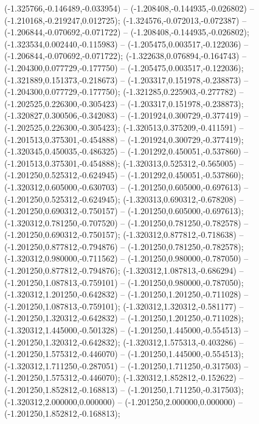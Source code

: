  (-1.325766,-0.146489,-0.033954) -- (-1.208408,-0.144935,-0.026802) -- (-1.210168,-0.219247,0.012725);
 (-1.324576,-0.072013,-0.072387) -- (-1.206844,-0.070692,-0.071722) -- (-1.208408,-0.144935,-0.026802);
 (-1.323534,0.002440,-0.115983) -- (-1.205475,0.003517,-0.122036) -- (-1.206844,-0.070692,-0.071722);
 (-1.322638,0.076894,-0.164743) -- (-1.204300,0.077729,-0.177750) -- (-1.205475,0.003517,-0.122036);
 (-1.321889,0.151373,-0.218673) -- (-1.203317,0.151978,-0.238873) -- (-1.204300,0.077729,-0.177750);
 (-1.321285,0.225903,-0.277782) -- (-1.202525,0.226300,-0.305423) -- (-1.203317,0.151978,-0.238873);
 (-1.320827,0.300506,-0.342083) -- (-1.201924,0.300729,-0.377419) -- (-1.202525,0.226300,-0.305423);
 (-1.320513,0.375209,-0.411591) -- (-1.201513,0.375301,-0.454888) -- (-1.201924,0.300729,-0.377419);
 (-1.320345,0.450035,-0.486325) -- (-1.201292,0.450051,-0.537860) -- (-1.201513,0.375301,-0.454888);
 (-1.320313,0.525312,-0.565005) -- (-1.201250,0.525312,-0.624945) -- (-1.201292,0.450051,-0.537860);
 (-1.320312,0.605000,-0.630703) -- (-1.201250,0.605000,-0.697613) -- (-1.201250,0.525312,-0.624945);
 (-1.320313,0.690312,-0.678208) -- (-1.201250,0.690312,-0.750157) -- (-1.201250,0.605000,-0.697613);
 (-1.320312,0.781250,-0.707520) -- (-1.201250,0.781250,-0.782578) -- (-1.201250,0.690312,-0.750157);
 (-1.320312,0.877812,-0.718638) -- (-1.201250,0.877812,-0.794876) -- (-1.201250,0.781250,-0.782578);
 (-1.320312,0.980000,-0.711562) -- (-1.201250,0.980000,-0.787050) -- (-1.201250,0.877812,-0.794876);
 (-1.320312,1.087813,-0.686294) -- (-1.201250,1.087813,-0.759101) -- (-1.201250,0.980000,-0.787050);
 (-1.320312,1.201250,-0.642832) -- (-1.201250,1.201250,-0.711028) -- (-1.201250,1.087813,-0.759101);
 (-1.320312,1.320312,-0.581177) -- (-1.201250,1.320312,-0.642832) -- (-1.201250,1.201250,-0.711028);
 (-1.320312,1.445000,-0.501328) -- (-1.201250,1.445000,-0.554513) -- (-1.201250,1.320312,-0.642832);
 (-1.320312,1.575313,-0.403286) -- (-1.201250,1.575312,-0.446070) -- (-1.201250,1.445000,-0.554513);
 (-1.320312,1.711250,-0.287051) -- (-1.201250,1.711250,-0.317503) -- (-1.201250,1.575312,-0.446070);
 (-1.320312,1.852812,-0.152622) -- (-1.201250,1.852812,-0.168813) -- (-1.201250,1.711250,-0.317503);
 (-1.320312,2.000000,0.000000) -- (-1.201250,2.000000,0.000000) -- (-1.201250,1.852812,-0.168813);
